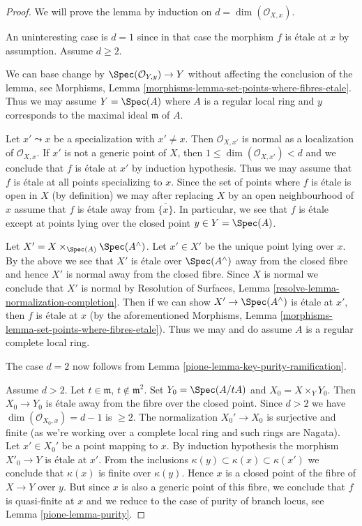 \begin{proof}

We will prove the lemma by induction on $d = \dim(\mathcal{O}_{X, x})$.

\medskip\noindent
An uninteresting case is $d = 1$ since in that case the morphism
$f$ is \'etale at $x$ by assumption. Assume $d \geq 2$.

\medskip\noindent
We can base change by $\Spec(\mathcal{O}_{Y, y}) \to Y$
without affecting the conclusion of the lemma, see
Morphisms, Lemma \ref{morphisms-lemma-set-points-where-fibres-etale}.
Thus we may assume $Y = \Spec(A)$ where $A$ is a regular local
ring and $y$ corresponds to the maximal ideal $\mathfrak m$ of $A$.

\medskip\noindent
Let $x' \leadsto x$ be a specialization with $x' \not = x$.
Then $\mathcal{O}_{X, x'}$ is normal as a localization of
$\mathcal{O}_{X, x}$. If $x'$ is not a generic point of $X$,
then $1 \leq \dim(\mathcal{O}_{X, x'}) < d$ and we conclude that
$f$ is \'etale at $x'$ by induction hypothesis.
Thus we may assume that $f$ is \'etale at all points specializing to
$x$. Since the set of points where $f$ is \'etale is open in $X$
(by definition) we may after replacing $X$ by an open neighbourhood of $x$
assume that $f$ is \'etale away from $\overline{\{x\}}$.
In particular, we see that $f$ is \'etale except at points
lying over the closed point $y \in Y = \Spec(A)$.

\medskip\noindent
Let $X' = X \times_{\Spec(A)} \Spec(A^\wedge)$. Let $x' \in X'$
be the unique point lying over $x$. By the above we see that
$X'$ is \'etale over $\Spec(A^\wedge)$ away from the closed fibre and
hence $X'$ is normal away from the closed fibre. Since $X$ is normal
we conclude that $X'$ is normal by
Resolution of Surfaces, Lemma \ref{resolve-lemma-normalization-completion}.
Then if we can show $X' \to \Spec(A^\wedge)$ is \'etale at $x'$,
then $f$ is \'etale at $x$ (by the aforementioned
Morphisms, Lemma \ref{morphisms-lemma-set-points-where-fibres-etale}).
Thus we may and do assume $A$ is a regular complete local ring.

\medskip\noindent
The case $d = 2$ now follows from Lemma \ref{pione-lemma-key-purity-ramification}.

\medskip\noindent
Assume $d > 2$. Let $t \in \mathfrak m$, $t \not \in \mathfrak m^2$.
Set $Y_0 = \Spec(A/tA)$ and $X_0 = X \times_Y Y_0$.
Then $X_0 \to Y_0$ is \'etale away from the fibre over the closed point.
Since $d > 2$ we have $\dim(\mathcal{O}_{X_0, x}) = d - 1$ is $\geq 2$.
The normalization $X_0' \to X_0$ is surjective and finite
(as we're working over a complete local ring and such rings are Nagata).
Let $x' \in X_0'$ be a point mapping to $x$. By induction hypothesis the
morphism $X'_0 \to Y$ is \'etale at $x'$. From the inclusions
$\kappa(y) \subset \kappa(x) \subset \kappa(x')$
we conclude that $\kappa(x)$ is finite over $\kappa(y)$.
Hence $x$ is a closed point of the fibre of $X \to Y$
over $y$. But since $x$ is also a generic point of
this fibre, we conclude that $f$ is quasi-finite at $x$
and we reduce to the case of purity of branch locus, see
Lemma \ref{pione-lemma-purity}.
\end{proof}

